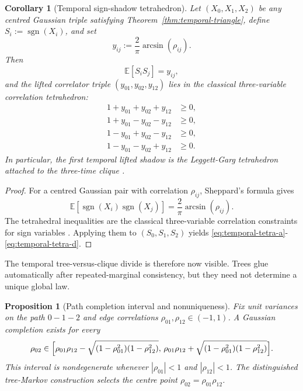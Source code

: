 \documentclass[11pt]{article}
\numberwithin{equation}{section}
\theoremstyle{thmcompact}
\newtheorem{proposition}[theorem]{Proposition}
\newtheorem{corollary}[theorem]{Corollary}
\theoremstyle{remark}
\begin{document}
\begin{corollary}[Temporal sign-shadow tetrahedron]\label{cor:temporal-sign-shadow}
Let $(X_0,X_1,X_2)$ be any centred Gaussian triple satisfying Theorem~\ref{thm:temporal-triangle}, define $S_i:=\operatorname{sgn}(X_i)$, and set
\[
y_{ij}:=\frac{2}{\pi}\arcsin(\rho_{ij}).
\]
Then
\[
\mathbb E[S_iS_j]=y_{ij},
\]
and the lifted correlator triple $(y_{01},y_{02},y_{12})$ lies in the classical three-variable correlation tetrahedron:
\begin{align}
1+y_{01}+y_{02}+y_{12}&\ge0,\label{eq:temporal-tetra-a}\\
1+y_{01}-y_{02}-y_{12}&\ge0,\label{eq:temporal-tetra-b}\\
1-y_{01}+y_{02}-y_{12}&\ge0,\label{eq:temporal-tetra-c}\\
1-y_{01}-y_{02}+y_{12}&\ge0.\label{eq:temporal-tetra-d}
\end{align}
In particular, the first temporal lifted shadow is the Leggett-Garg tetrahedron attached to the three-time clique \cite{LeggettGarg1985}.
\end{corollary}

\begin{proof}
For a centred Gaussian pair with correlation $\rho_{ij}$, Sheppard's formula gives
\[
\mathbb E[\operatorname{sgn}(X_i)\operatorname{sgn}(X_j)]=\frac{2}{\pi}\arcsin(\rho_{ij}).
\]
The tetrahedral inequalities are the classical three-variable correlation constraints for sign variables \cite{LeggettGarg1985}. Applying them to $(S_0,S_1,S_2)$ yields \eqref{eq:temporal-tetra-a}-\eqref{eq:temporal-tetra-d}.
\end{proof}

The temporal tree-versus-clique divide is therefore now visible. Trees glue automatically after repeated-marginal consistency, but they need not determine a unique global law.

\begin{proposition}[Path completion interval and nonuniqueness]\label{prop:path-completion-interval}
Fix unit variances on the path $0-1-2$ and edge correlations $\rho_{01},\rho_{12}\in(-1,1)$. A Gaussian completion exists for every
\[
\rho_{02}\in\Bigl[\rho_{01}\rho_{12}-\sqrt{(1-\rho_{01}^2)(1-\rho_{12}^2)},\,\rho_{01}\rho_{12}+\sqrt{(1-\rho_{01}^2)(1-\rho_{12}^2)}\Bigr].
\]
This interval is nondegenerate whenever $|\rho_{01}|<1$ and $|\rho_{12}|<1$. The distinguished tree-Markov construction selects the centre point $\rho_{02}=\rho_{01}\rho_{12}$.
\end{proposition}
\end{document}
